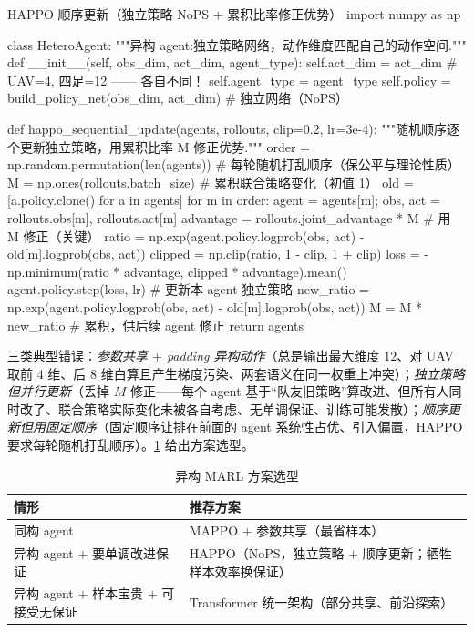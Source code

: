 \begin{codebox}[Python]{HAPPO 顺序更新（独立策略 NoPS $+$ 累积比率修正优势）}
import numpy as np

class HeteroAgent:
    """异构 agent:独立策略网络，动作维度匹配自己的动作空间."""
    def __init__(self, obs_dim, act_dim, agent_type):
        self.act_dim = act_dim                  # UAV=4, 四足=12 —— 各自不同！
        self.agent_type = agent_type
        self.policy = build_policy_net(obs_dim, act_dim)   # 独立网络（NoPS）

def happo_sequential_update(agents, rollouts, clip=0.2, lr=3e-4):
    """随机顺序逐个更新独立策略，用累积比率 M 修正优势."""
    order = np.random.permutation(len(agents))  # 每轮随机打乱顺序（保公平与理论性质）
    M = np.ones(rollouts.batch_size)            # 累积联合策略变化（初值 1）
    old = [a.policy.clone() for a in agents]
    for m in order:
        agent = agents[m]; obs, act = rollouts.obs[m], rollouts.act[m]
        advantage = rollouts.joint_advantage * M               # 用 M 修正（关键）
        ratio = np.exp(agent.policy.logprob(obs, act) - old[m].logprob(obs, act))
        clipped = np.clip(ratio, 1 - clip, 1 + clip)
        loss = -np.minimum(ratio * advantage, clipped * advantage).mean()
        agent.policy.step(loss, lr)                            # 更新本 agent 独立策略
        new_ratio = np.exp(agent.policy.logprob(obs, act) - old[m].logprob(obs, act))
        M = M * new_ratio                                      # 累积，供后续 agent 修正
    return agents
\end{codebox}

\noindent 三类典型错误：\emph{参数共享 $+$ padding 异构动作}（总是输出最大维度 $12$、对 UAV 取前 $4$ 维、后 $8$ 维白算且产生梯度污染、两套语义在同一权重上冲突）；\emph{独立策略但并行更新}（丢掉 $M$ 修正——每个 agent 基于“队友旧策略”算改进、但所有人同时改了、联合策略实际变化未被各自考虑、无单调保证、训练可能发散）；\emph{顺序更新但用固定顺序}（固定顺序让排在前面的 agent 系统性占优、引入偏置，HAPPO 要求每轮随机打乱顺序）。\cref{tab:hmr-marl-choose} 给出方案选型。

\begin{table}[H]\centering\small
\caption{异构 MARL 方案选型}
\label{tab:hmr-marl-choose}
\begin{tabular}{ll}
\toprule
情形 & 推荐方案 \\
\midrule
同构 agent & MAPPO $+$ 参数共享（最省样本） \\
异构 agent $+$ 要单调改进保证 & HAPPO（NoPS，独立策略 $+$ 顺序更新；牺牲样本效率换保证） \\
异构 agent $+$ 样本宝贵 $+$ 可接受无保证 & Transformer 统一架构（部分共享、前沿探索） \\
\bottomrule
\end{tabular}
\end{table}

